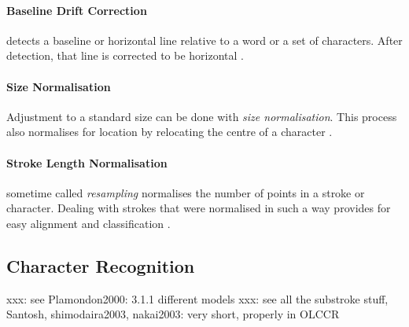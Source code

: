 \paragraph{Baseline Drift Correction} 
detects a baseline or horizontal line relative
to a word or a set of characters. After detection, that line is corrected to
be horizontal .

\paragraph{Size Normalisation}
Adjustment to a standard size can be done with \emph{size normalisation}. This 
process also normalises for location by relocating the centre of a character
.

\paragraph{Stroke Length Normalisation}
sometime called \emph{resampling} normalises
the number of points in a stroke or character. Dealing with strokes that were 
normalised in such a way provides for easy alignment and classification 
. 

\subsection{Character Recognition}
\label{sec:characterrecognition}

xxx: see Plamondon2000: 3.1.1 different models
xxx: see all the substroke stuff, Santosh, shimodaira2003, nakai2003: very short, properly in OLCCR

